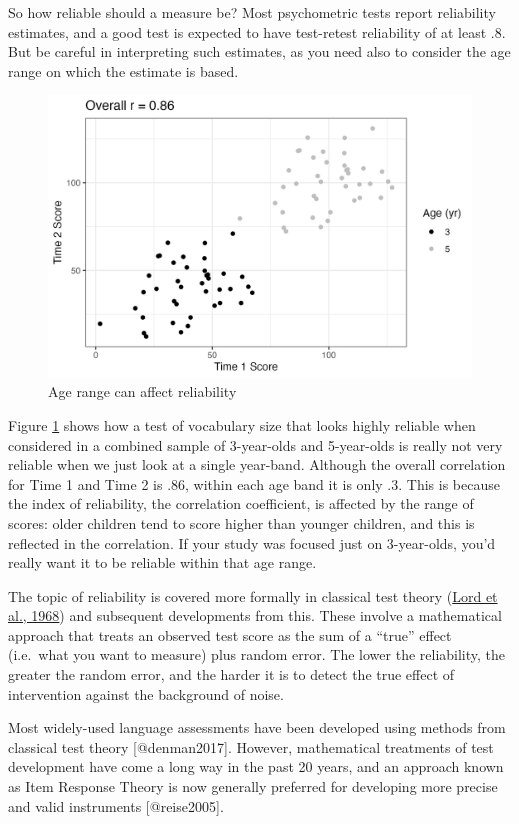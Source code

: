\documentclass{krantz}
\begin{document}
So how reliable should a measure be? Most psychometric tests report reliability estimates, and a good test is expected to have test-retest reliability of at least .8. But be careful in interpreting such estimates, as you need also to consider the age range on which the estimate is based.

\begin{figure}
\includegraphics[width=0.8\linewidth]{images_bw/reliability-by-age} \caption{Age range can affect reliability}\label{fig:reliability-by-age}
\end{figure}

Figure \ref{fig:reliability-by-age} shows how a test of vocabulary size that looks highly reliable when considered in a combined sample of 3-year-olds and 5-year-olds is really not very reliable when we just look at a single year-band. Although the overall correlation for Time 1 and Time 2 is .86, within each age band it is only .3. This is because the index of reliability, the correlation coefficient, is affected by the range of scores: older children tend to score higher than younger children, and this is reflected in the correlation. If your study was focused just on 3-year-olds, you'd really want it to be reliable within that age range.

The topic of reliability is covered more formally in classical test theory (\protect\hyperlink{ref-lord1968}{Lord et al., 1968}) and subsequent developments from this. These involve a mathematical approach that treats an observed test score as the sum of a ``true'' effect (i.e.~what you want to measure) plus random error. The lower the reliability, the greater the random error, and the harder it is to detect the true effect of intervention against the background of noise.

\begin{tcolorbox}[colback=Black!5!lightgray,colframe=black!75!black,coltitle=white,title=Item Response Theory]\label{box:IRT}
Most widely-used language assessments have been developed using methods from classical test theory [@denman2017]. However, mathematical treatments of test development have come a long way in the past 20 years, and an approach known as Item Response Theory is now generally preferred for developing more precise and valid instruments [@reise2005].  
\end{tcolorbox}
\end{document}
